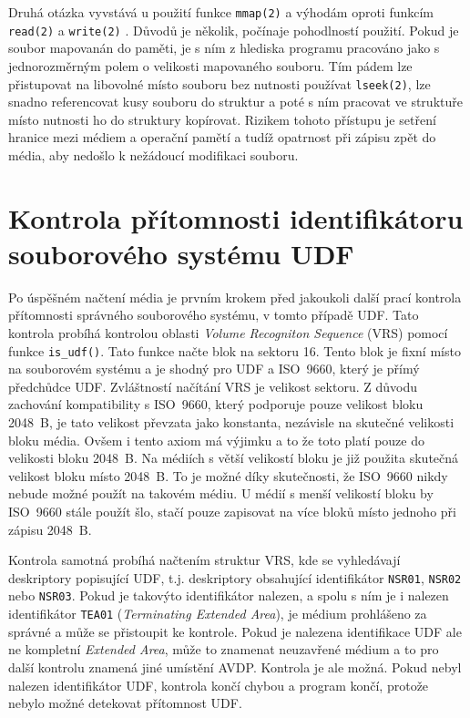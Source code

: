 Druhá otázka vyvstává u použití funkce \texttt{mmap(2)} a výhodám oproti funkcím \texttt{read(2)} \cite{man-read} a \texttt{write(2)} \cite{man-write}. Důvodů je několik, počínaje pohodlností použití. Pokud je soubor mapovanán do paměti, je s ním z hlediska programu pracováno jako s jednorozměrným polem o velikosti mapovaného souboru. Tím pádem lze přistupovat na libovolné místo souboru bez nutnosti používat \texttt{lseek(2)}, lze snadno referencovat kusy souboru do struktur a poté s ním pracovat ve struktuře místo nutnosti ho do struktury kopírovat. Rizikem tohoto přístupu je setření hranice mezi médiem a operační pamětí a tudíž opatrnost při zápisu zpět do média, aby nedošlo k nežádoucí modifikaci souboru.

\section{Kontrola přítomnosti identifikátoru souborového systému UDF}
\label{sec:kontrola-pritomonosti-udf}
Po úspěšném načtení média je prvním krokem před jakoukoli další prací kontrola přítomnosti správného souborového systému, v tomto případě UDF. Tato kontrola probíhá kontrolou oblasti \textit{Volume Recogniton Sequence} (VRS) pomocí funkce \texttt{is\_udf()}. Tato funkce načte blok na sektoru 16. Tento blok je fixní místo na souborovém systému a je shodný pro UDF a ISO~9660, který je přímý předchůdce UDF. Zvláštností načítání VRS je velikost sektoru. Z důvodu zachování kompatibility s ISO~9660, který podporuje pouze velikost bloku 2048~B, je tato velikost převzata jako konstanta, nezávisle na skutečné velikosti bloku média. Ovšem i tento axiom má výjimku a to že toto platí pouze do velikosti bloku 2048~B. Na médiích s větší velikostí bloku je již použita skutečná velikost bloku místo 2048~B. To je možné díky skutečnosti, že ISO~9660 nikdy nebude možné použít na takovém médiu. U médií s menší velikostí bloku by ISO~9660 stále použít šlo, stačí pouze zapisovat na více bloků místo jednoho při zápisu 2048~B.

Kontrola samotná probíhá načtením struktur VRS, kde se vyhledávají deskriptory popisující UDF, t.j. deskriptory obsahující identifikátor \texttt{NSR01}, \texttt{NSR02} nebo \texttt{NSR03}. Pokud je takovýto identifikátor nalezen, a spolu s ním je i nalezen identifikátor \texttt{TEA01} (\textit{Terminating Extended Area}), je médium prohlášeno za správné a může se přistoupit ke kontrole. Pokud je nalezena identifikace UDF ale ne kompletní \textit{Extended Area}, může to znamenat neuzavřené médium a to pro další kontrolu znamená jiné umístění AVDP. Kontrola je ale možná. Pokud nebyl nalezen identifikátor UDF, kontrola končí chybou a program končí, protože nebylo možné detekovat přítomnost UDF.

